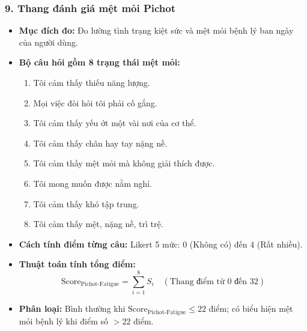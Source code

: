 \documentclass[12pt,a4paper]{article}
\begin{document}
\subsubsection*{9. Thang đánh giá mệt mỏi Pichot}
\begin{itemize}
    \item \textbf{Mục đích đo:} Đo lường tình trạng kiệt sức và mệt mỏi bệnh lý ban ngày của người dùng.
    \item \textbf{Bộ câu hỏi gồm 8 trạng thái mệt mỏi:}
    \begin{enumerate}
        \item Tôi cảm thấy thiếu năng lượng.
        \item Mọi việc đòi hỏi tôi phải cố gắng.
        \item Tôi cảm thấy yếu ớt một vài nơi của cơ thể.
        \item Tôi cảm thấy chân hay tay nặng nề.
        \item Tôi cảm thấy mệt mỏi mà không giải thích được.
        \item Tôi mong muốn được nằm nghỉ.
        \item Tôi cảm thấy khó tập trung.
        \item Tôi cảm thấy mệt, nặng nề, trì trệ.
    \end{enumerate}
    \item \textbf{Cách tính điểm từng câu:} Likert 5 mức: 0 (Không có) đến 4 (Rất nhiều).
    \item \textbf{Thuật toán tính tổng điểm:}
    \begin{equation}
        \text{Score}_{\text{Pichot-Fatigue}} = \sum_{i=1}^{8} S_i \quad (\text{Thang điểm từ } 0 \text{ đến } 32)
    \end{equation}
    \item \textbf{Phân loại:} Bình thường khi $\text{Score}_{\text{Pichot-Fatigue}} \le 22$ điểm; có biểu hiện mệt mỏi bệnh lý khi điểm số $> 22$ điểm.
\end{itemize}
\end{document}

